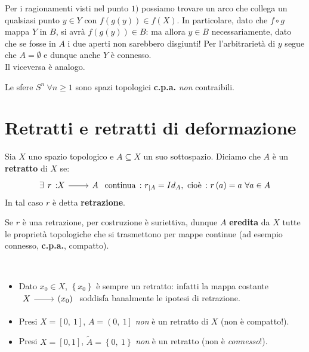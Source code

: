 \begin{demonstration}
\begin{enumerate}[label=\Roman*]
Per i ragionamenti visti nel punto $1)$ possiamo trovare un arco che collega un qualsiasi punto $y\in Y$ con $f\left(g\left(y\right)\right)\in f\left(X\right)$. In particolare, dato che $f\circ g$ mappa $Y$ in $B$, si avrà $f\left(g\left(y\right)\right)\in B$: ma allora $y\in B$ necessariamente, dato che se fosse in $A$ i due aperti non sarebbero disgiunti! Per l'arbitrarietà di $y$ segue che $A=\emptyset$ e dunque anche $Y$ è connesso.\\
Il viceversa è analogo.
\end{enumerate}
	\end{demonstration}
\begin{example}
	Le sfere $S^n\ \forall n\geq 1$ sono spazi topologici \textbf{c.p.a.} \textit{non} contraibili.
\end{example}
\section{Retratti e retratti di deformazione}
\begin{define}
	Sia $X$ uno spazio topologico e $A\subseteq X$ un suo sottospazio. Diciamo che $A$ è un \textbf{retratto} di $X$ se:
	\begin{equation}
		\exists \funz{r}{X}{A}\text{ continua}\ \colon r_{\mid A}=Id_A,\ \text{cioè}\ \colon r\left(a\right)=a\ \forall a\in A
	\end{equation}
In tal caso $r$ è detta \textbf{retrazione}.
\end{define}
\begin{observe}
Se $r$ è una retrazione, per costruzione è suriettiva, dunque $A$ \textbf{eredita} da $X$ tutte le proprietà topologiche che si trasmettono per mappe continue (ad esempio connesso, \textbf{c.p.a.}, compatto).
\end{observe}
\begin{examples}~{}
	\begin{itemize}
		\item Dato $x_0\in X$, $\left\{x_0\right\}$ è sempre un retratto: infatti la mappa costante $\funz{\ }{X}{\left(x_0\right)}$ soddisfa banalmente le ipotesi di retrazione.
		\item Presi $X=\left[0,\ 1\right]$, $A=\left(0,\ 1\right]$ \textit{non} è un retratto di $X$ (non è compatto!).
		\item Presi $X=\left[0, 1\right]$, $\tilde{A}=\left\{0,\ 1\right\}$ \textit{non} è un retratto (non è \textit{connesso}!).
	\end{itemize}
\end{examples}
